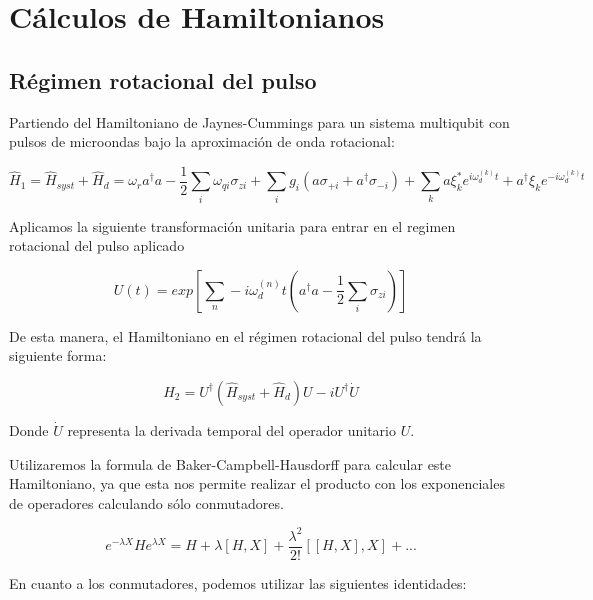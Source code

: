 \chapter{Cálculos de Hamiltonianos}
\label{ch:hamiltonians}

\section{Régimen rotacional del pulso}

Partiendo del Hamiltoniano de Jaynes-Cummings para un sistema multiqubit con pulsos de microondas bajo la aproximación de onda rotacional:

\begin{equation}
    \hat{H}_1 = \hat{H}_{syst} + \hat{H}_d = \omega_r a^\dag a - \frac{1}{2} \sum\limits_i \omega_{qi} \sigma_{zi} + \sum\limits_i g_i (a \sigma_{+ i} + a^\dagger \sigma_{- i}) + \sum\limits_k a\xi_k^*e^{i\omega_d^{(k)}t}+ a^\dagger\xi_ke^{-i\omega_d^{(k)}t}
\end{equation}

Aplicamos la siguiente transformación unitaria para entrar en el regimen rotacional del pulso aplicado

\begin{equation}
    U(t) = exp[\sum\limits_n-i \omega_d^{(n)} t(a^\dagger a - \frac{1}{2} \sum\limits_i \sigma_{z i})]
\end{equation}

De esta manera, el Hamiltoniano en el régimen rotacional del pulso tendrá la siguiente forma:

\begin{equation}
    \hat{H}_2 = U^\dagger (\hat{H}_{syst} + \hat{H}_d) U - i U^\dagger \dot{U}
\end{equation}

Donde $\dot{U}$ representa la derivada temporal del operador unitario $U$.

Utilizaremos la formula de Baker-Campbell-Hausdorff para calcular este Hamiltoniano, ya que esta nos permite realizar el producto con los exponenciales de operadores calculando sólo conmutadores.

\begin{equation}
    e^{-\lambda X} H e^{\lambda X} = H + \lambda [H,X] + \frac{\lambda^2}{2!}[[H,X],X] + ...
\end{equation}

En cuanto a los conmutadores, podemos utilizar las siguientes identidades:

